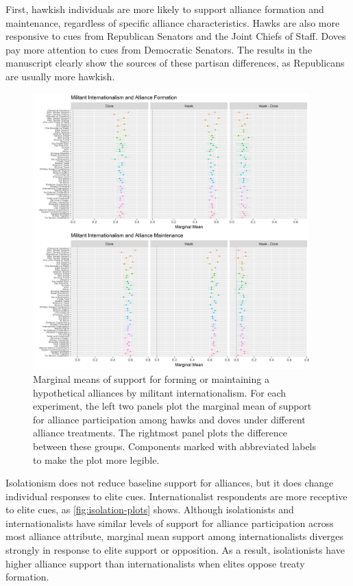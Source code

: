 \documentclass[12pt]{article}
\begin{document}
First, hawkish individuals are more likely to support alliance formation and maintenance, regardless of specific alliance characteristics. 
Hawks are also more responsive to cues from Republican Senators and the Joint Chiefs of Staff. 
Doves pay more attention to cues from Democratic Senators.
The results in the manuscript clearly show the sources of these partisan differences, as Republicans are usually more hawkish. 


\begin{figure}
	\centering
		\includegraphics[width=0.95\textwidth]{hawk-plots.png}
	\caption{Marginal means of support for forming or maintaining a hypothetical alliances by militant internationalism. For each experiment, the left two panels plot the marginal mean of support for alliance participation among hawks and doves under different alliance treatments. The rightmost panel plots the difference between these groups. Components marked with abbreviated labels to make the plot more legible.}
	\label{fig:hawk-plots}
\end{figure}


Isolationism does not reduce baseline support for alliances, but it does change individual responses to elite cues. 
Internationalist respondents are more receptive to elite cues, as \autoref{fig:isolation-plots} shows. 
Although isolationists and internationalists have similar levels of support for alliance participation across most alliance attribute, marginal mean support among internationalists diverges strongly in response to elite support or opposition. 
As a result, isolationists have higher alliance support than internationalists when elites oppose treaty formation. 
\end{document}
